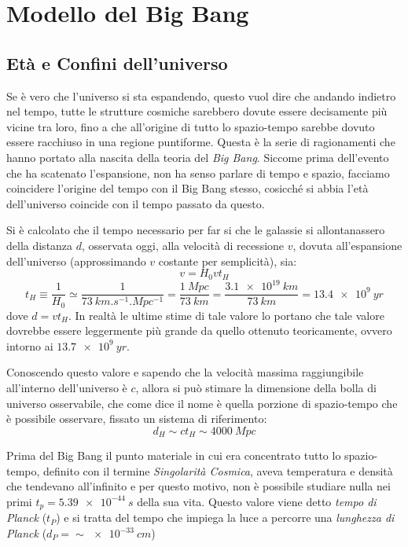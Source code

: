 \section{Modello del Big Bang}\label{sec:big-bang}
\subsection{Età e Confini dell'universo}\label{sec:eta-confini-universo}

Se è vero che l'universo si sta espandendo, questo vuol dire che andando indietro nel tempo, tutte le strutture cosmiche sarebbero dovute essere decisamente più vicine tra loro, fino a che all'origine di tutto lo spazio-tempo sarebbe dovuto essere racchiuso in una regione puntiforme. Questa è la serie di ragionamenti che hanno portato alla nascita della teoria del \textit{Big Bang}. Siccome prima dell'evento che ha scatenato l'espansione, non ha senso parlare di tempo e spazio, facciamo coincidere l'origine del tempo con il Big Bang stesso, cosicché si abbia l'età dell'universo coincide con il tempo passato da questo.

Si è calcolato che il tempo necessario per far si che le galassie si allontanassero della distanza $d$, osservata oggi, alla velocità di recessione $v$, dovuta all'espansione dell'universo (approssimando $v$ costante per semplicità), sia:
\[
    v = H_0 v t_H
\]
\begin{equation} \label{eq:eta-universo}
    t_H \equiv \frac{1}{H_0} \simeq \frac{1}{\SI{73}{km.s^{-1}.Mpc^{-1}}} = \frac{\SI{1}{Mpc}}{\SI{73}{km}} = \frac{\SI{3.1e19}{km}}{\SI{73}{km}} = \SI{13.4e9}{yr}
\end{equation}
dove $d = v t_{H}$. In realtà le ultime stime di tale valore lo portano che tale valore dovrebbe essere leggermente più grande da quello ottenuto teoricamente, ovvero intorno ai $\SI{13.7e9}{yr}$.

Conoscendo questo valore e sapendo che la velocità massima raggiungibile all'interno dell'universo è $c$, allora si può stimare la dimensione della bolla di universo osservabile, che come dice il nome è quella porzione di spazio-tempo che è possibile osservare, fissato un sistema di riferimento:
\[
    d_H \sim c t_H \sim \SI{4000}{Mpc}
\]

Prima del Big Bang il punto materiale in cui era concentrato tutto lo spazio-tempo, definito con il termine \textit{Singolarità Cosmica}, aveva temperatura e densità che tendevano all'infinito e per questo motivo, non è possibile studiare nulla nei primi $t_p = \SI{5.39e-44}{s}$ della sua vita. Questo valore viene detto \textit{tempo di Planck} ($t_P$) e si tratta del tempo che impiega la luce a percorre una \textit{lunghezza di Planck} ($d_P = \sim \SI{e-33}{cm}$)

